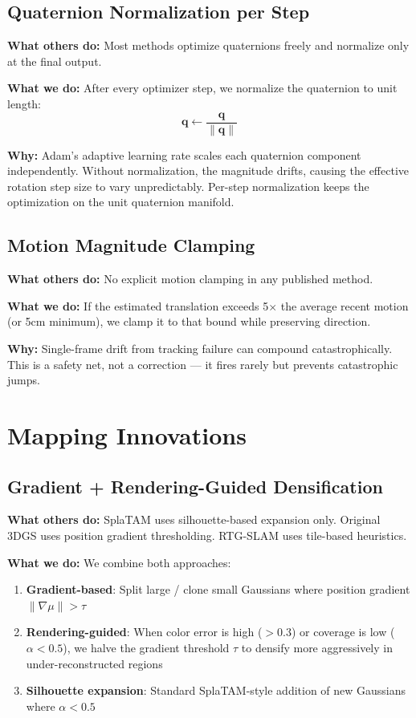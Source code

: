 \documentclass[10pt,twocolumn]{article}
\begin{document}
\subsection{Quaternion Normalization per Step}

\textbf{What others do:} Most methods optimize quaternions freely and normalize only at the final output.

\textbf{What we do:} After every optimizer step, we normalize the quaternion to unit length:
\begin{equation}
\mathbf{q} \leftarrow \frac{\mathbf{q}}{\|\mathbf{q}\|}
\end{equation}

\textbf{Why:} Adam's adaptive learning rate scales each quaternion component independently. Without normalization, the magnitude drifts, causing the effective rotation step size to vary unpredictably. Per-step normalization keeps the optimization on the unit quaternion manifold.

\subsection{Motion Magnitude Clamping}

\textbf{What others do:} No explicit motion clamping in any published method.

\textbf{What we do:} If the estimated translation exceeds 5$\times$ the average recent motion (or 5cm minimum), we clamp it to that bound while preserving direction.

\textbf{Why:} Single-frame drift from tracking failure can compound catastrophically. This is a safety net, not a correction --- it fires rarely but prevents catastrophic jumps.

\section{Mapping Innovations}

\subsection{Gradient + Rendering-Guided Densification}

\textbf{What others do:} SplaTAM uses silhouette-based expansion only. Original 3DGS uses position gradient thresholding. RTG-SLAM uses tile-based heuristics.

\textbf{What we do:} We combine both approaches:
\begin{enumerate}[itemsep=2pt]
\item \textbf{Gradient-based}: Split large / clone small Gaussians where position gradient $\|\nabla \mu\| > \tau$
\item \textbf{Rendering-guided}: When color error is high ($>0.3$) or coverage is low ($\alpha < 0.5$), we halve the gradient threshold $\tau$ to densify more aggressively in under-reconstructed regions
\item \textbf{Silhouette expansion}: Standard SplaTAM-style addition of new Gaussians where $\alpha < 0.5$
\end{enumerate}
\end{document}
